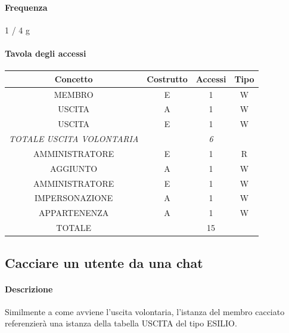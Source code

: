 \documentclass[a4paper,12pt]{report}
\begin{document}
\paragraph{Frequenza} 1 / 4 g
\begin{table}[H]
\paragraph{Tavola degli accessi\newline}
\begin{tabular}{|c|c|c|c|}
\hline
Concetto                          & Costrutto & Accessi    & Tipo \\ \hline
MEMBRO                            & E         & 1          & W    \\ \hline
USCITA                            & A         & 1          & W    \\ \hline
USCITA                            & E         & 1          & W    \\ \hline
\textit{TOTALE USCITA VOLONTARIA} &           & \textit{6} &      \\ \hline
AMMINISTRATORE                    & E         & 1          & R    \\ \hline
AGGIUNTO                          & A         & 1          & W    \\ \hline
AMMINISTRATORE                    & E         & 1          & W    \\ \hline
IMPERSONAZIONE                    & A         & 1          & W    \\ \hline
APPARTENENZA                      & A         & 1          & W    \\ \hline
TOTALE                            &           & 15         &      \\ \hline
\end{tabular}
\end{table}
\subsection{Cacciare un utente da una chat} \label{cacciare}
\paragraph{Descrizione} Similmente a come avviene l'uscita volontaria, l'istanza del membro cacciato referenzierà una istanza della tabella USCITA del tipo ESILIO.
\end{document}
